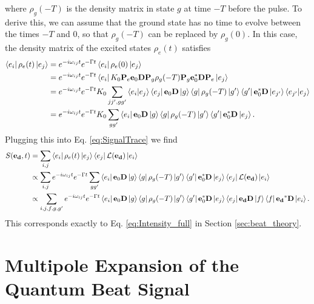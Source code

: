 \documentclass[11pt]{article}
\newcommand{\lag}{\mathcal{L}}
\begin{document}
where $\rho_g(-T)$ is the density matrix in state $g$ at time $-T$ before the pulse. To derive this, we can assume that the ground state has no time to evolve between the times $-T$ and $0$, so that $\rho_g(-T)$ can be replaced by $\rho_g(0)$. In this case, the density matrix of the excited states $\rho_e(t)$ satisfies
\begin{align*}
\bra{e_i} \rho_e(t) \ket{e_j} 
&= e^{-i\omega_{ij}t} e^{-\Gamma t} \bra{e_i} \rho_e(0) \ket{e_j} \nonumber\\
&= e^{-i\omega_{ij}t} e^{-\Gamma t} \bra{e_i} K_0 \mathbf{P}_e \mathbf{e}_0 \mathbf{D} \mathbf{P}_g \rho_g(-T) \mathbf{P}_g \mathbf{e}_0^* \mathbf{D} \mathbf{P}_e \ket{e_j} \nonumber \\
&= e^{-i\omega_{ij}t} e^{-\Gamma t} K_0  \sum_{jj',gg'} \bra{e_i}\ket{e_j}\bra{e_j}\mathbf{e}_0 \mathbf{D} \ket{g}\bra{g} \rho_g(-T) \ket{g'}\bra{g'} \mathbf{e}_0^* \mathbf{D} \ket{e_{j'}}\bra{e_{j'}}\ket{e_j} \\
&= e^{-i\omega_{ij}t} e^{-\Gamma t} K_0  \sum_{gg'} \bra{e_i}\mathbf{e}_0 \mathbf{D} \ket{g}\bra{g} \rho_g(-T) \ket{g'}\bra{g'} \mathbf{e}_0^* \mathbf{D} \ket{e_{j}}.
\end{align*}
Plugging this into Eq. \ref{eq:SignalTrace} we find 
\begin{align}\label{eq:signal_full}
S(\mathbf{e_d},t) &= \sum_{i,j} \bra{e_i}\rho_e(t)\ket{e_j} \bra{e_j}\lag(\mathbf{e_d}) \ket{e_i} \nonumber\\
&\propto \sum_{i,j} e^{-i\omega_{ij}t} e^{-\Gamma t} \sum_{gg'} \bra{e_i}\mathbf{e}_0 \mathbf{D} \ket{g}\bra{g} \rho_g(-T) \ket{g'}\bra{g'} \mathbf{e}_0^* \mathbf{D} \ket{e_{j}} \bra{e_j}\lag(\mathbf{e_d}) \ket{e_i} \nonumber\\
&\propto \sum_{i,j,f,g,g'} e^{-i\omega_{ij}t} e^{-\Gamma t}  \bra{e_i}\mathbf{e}_0 \mathbf{D} \ket{g}\bra{g} \rho_g(-T) \ket{g'}\bra{g'} \mathbf{e}_0^* \mathbf{D} \ket{e_{j}} \bra{e_j}\mathbf{e_d} \mathbf{D}\ket{f}\bra{f}\mathbf{e_d}^* \mathbf{D} \ket{e_i}.
\end{align} 
This corresponds exactly to Eq. \ref{eq:Intensity_full} in Section \ref{sec:beat_theory}.



\section{Multipole Expansion of the Quantum Beat Signal}









\end{document}
